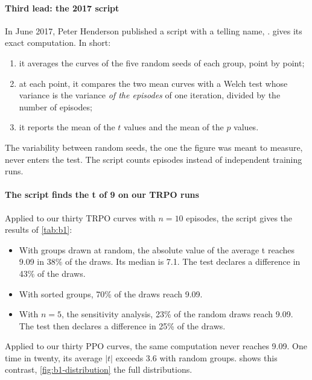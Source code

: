 \paragraph{Third lead: the 2017 script}
In June 2017, Peter Henderson published a script with a telling name, 
\parencite{henderson2017samedist}.  gives its exact computation. In short:
\begin{enumerate}
  \item it averages the curves of the five random seeds of each group, point by point;
  \item at each point, it compares the two mean curves with a Welch test whose variance is the variance
    \emph{of the episodes} of one iteration, divided by the number of episodes;
  \item it reports the mean of the $t$ values and the mean of the $p$ values.
\end{enumerate}
The variability between random seeds, the one the figure was meant to measure, never enters the test. The
script counts episodes instead of independent training runs.

\paragraph{The script finds the t of 9 on our TRPO runs}
Applied to our thirty TRPO curves with $n=10$ episodes,
the script gives the results of \cref{tab:b1}:
\begin{itemize}
  \item With groups drawn at random, the absolute value of the average t reaches 9.09 in 38\% of the draws.
    Its median is 7.1. The test declares a difference in 43\% of the draws.
  \item With sorted groups, 70\% of the draws reach 9.09.
  \item With $n=5$, the sensitivity analysis, 23\% of the random draws reach 9.09. The test then declares a
    difference in 25\% of the draws.
\end{itemize}
Applied to our thirty PPO curves, the same computation never reaches 9.09. One time in twenty, its average
$|t|$ exceeds 3.6 with random groups.  shows this contrast, \cref{fig:b1-distribution}
the full distributions.


